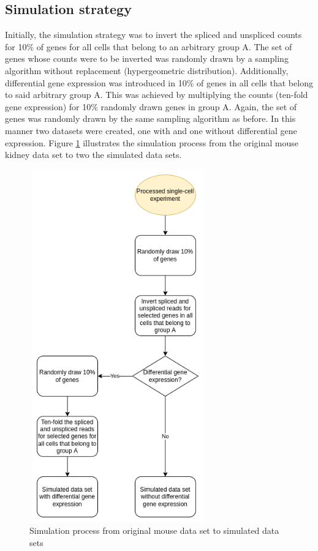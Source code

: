\subsection{Simulation strategy}
Initially, the simulation strategy was to invert the spliced and unspliced counts for 10\% of genes for all cells that belong to an arbitrary group A. The set of genes whose counts were to be inverted was randomly drawn by a sampling algorithm without replacement (hypergeometric distribution). Additionally, differential gene expression was introduced in 10\% of genes in all cells that belong to said arbitrary group A. This was achieved by multiplying the counts (ten-fold gene expression) for 10\% randomly drawn genes in group A. Again, the set of genes was randomly drawn by the same sampling algorithm as before. In this manner two datasets were created, one with and one without differential gene expression. Figure \ref{fig:simulation_process} illustrates the simulation process from the original mouse kidney data set to two the simulated data sets.

\begin{figure}[!htb]
\begin{center}
\includegraphics[width=3in,height=6in]{figure/kidney_mouse/first_simulation_process.png}
\end{center}
\caption{Simulation process from original mouse data set to simulated data sets}
\label{fig:simulation_process}
\end{figure}
\FloatBarrier

